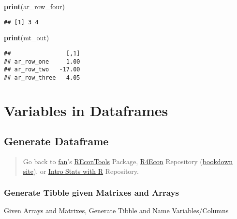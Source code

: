 \documentclass[
]{book}
\newenvironment{Shaded}{\begin{snugshade}}{\end{snugshade}}
\newcommand{\KeywordTok}[1]{\textcolor[rgb]{0.13,0.29,0.53}{\textbf{#1}}}
\newcommand{\NormalTok}[1]{#1}
\begin{document}
\begin{Shaded}
\begin{Highlighting}[]
\KeywordTok{print}\NormalTok{(ar_row_four)}
\end{Highlighting}
\end{Shaded}

\begin{verbatim}
## [1] 3 4
\end{verbatim}

\begin{Shaded}
\begin{Highlighting}[]
\KeywordTok{print}\NormalTok{(mt_out)}
\end{Highlighting}
\end{Shaded}

\begin{verbatim}
##                [,1]
## ar_row_one     1.00
## ar_row_two   -17.00
## ar_row_three   4.05
\end{verbatim}

\hypertarget{variables-in-dataframes}{%
\section{Variables in Dataframes}\label{variables-in-dataframes}}

\hypertarget{generate-dataframe}{%
\subsection{Generate Dataframe}\label{generate-dataframe}}

\begin{quote}
Go back to \href{http://fanwangecon.github.io/}{fan}'s \href{https://fanwangecon.github.io/REconTools/}{REconTools} Package, \href{https://fanwangecon.github.io/R4Econ/}{R4Econ} Repository (\href{https://fanwangecon.github.io/R4Econ/bookdown}{bookdown site}), or \href{https://fanwangecon.github.io/Stat4Econ/}{Intro Stats with R} Repository.
\end{quote}

\hypertarget{generate-tibble-given-matrixes-and-arrays}{%
\subsubsection{Generate Tibble given Matrixes and Arrays}\label{generate-tibble-given-matrixes-and-arrays}}

Given Arrays and Matrixes, Generate Tibble and Name Variables/Columns
\end{document}
